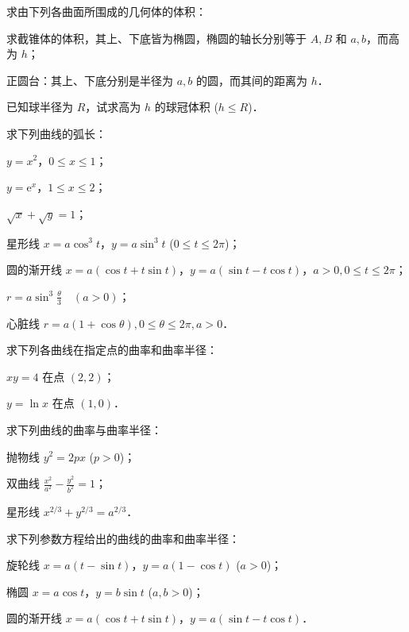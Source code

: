 \begin{xiti}
\item 求由下列各曲面所围成的几何体的体积：
\begin{ziti}
\item 求截锥体的体积，其上、下底皆为椭圆，椭圆的轴长分别等于 $A, B$ 和 $a, b$，而高为 $h$；
\item 正圆台：其上、下底分别是半径为 $a, b$ 的圆，而其间的距离为 $h$．
\end{ziti}

\item 已知球半径为 $R$，试求高为 $h$ 的球冠体积 ($h \leqslant R$)．

\item 求下列曲线的弧长：
\begin{ziti}
\item $y = x^2$，$0 \leqslant x \leqslant 1$；
\item $y = \mathrm{e}^x$，$1 \leqslant x \leqslant 2$；
\item $\sqrt{x} + \sqrt{y} = 1$；
\item 星形线 $x = a\cos^3 t$，$y = a\sin^3 t$ ($0 \leqslant t \leqslant 2\pi$)；
\item 圆的渐开线 $x = a(\cos t + t\sin t)$，$y = a(\sin t - t\cos t)$，$a > 0, 0 \leqslant t \leqslant 2\pi$；
\item $r = a\sin^3\frac{\theta}{3} \quad (a > 0)$；
\item 心脏线 $r = a(1 + \cos\theta), 0 \leqslant \theta \leqslant 2\pi, a > 0$．
\end{ziti}

\item 求下列各曲线在指定点的曲率和曲率半径：
\begin{ziti}
\item $xy = 4$ 在点 $(2, 2)$；
\item $y = \ln x$ 在点 $(1, 0)$．
\end{ziti}

\item 求下列曲线的曲率与曲率半径：
\begin{ziti}
\item 抛物线 $y^2 = 2px$ ($p > 0$)；
\item 双曲线 $\frac{x^2}{a^2} - \frac{y^2}{b^2} = 1$；
\item 星形线 $x^{2/3} + y^{2/3} = a^{2/3}$．
\end{ziti}

\item 求下列参数方程给出的曲线的曲率和曲率半径：
\begin{ziti}
\item 旋轮线 $x = a(t - \sin t)$，$y = a(1 - \cos t)$ ($a > 0$)；
\item 椭圆 $x = a\cos t$，$y = b\sin t$ ($a, b > 0$)；
\item 圆的渐开线 $x = a(\cos t + t\sin t)$，$y = a(\sin t - t\cos t)$．
\end{ziti}


\end{xiti}
